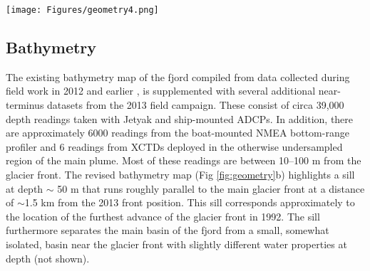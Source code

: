 \documentclass[10pt,letterpaper]{article}
\begin{document}
  \begin{figure*}[t]
 \begin{center}
  \texttt{[image: Figures/geometry4.png]}
  \caption{(a) Map of the lower part of Sarqardliup Sermia, and Sarqardleq fjord. The inset of Greenland indicates the location of the glacier. (b) Gridded bathymetry from in-situ observations (readings indicated by gray dots). Also shown are the surface height from ArcticDEM, collected during an overflight on 22 March 2013; Digital Elevation Map created by the Polar Geospatial Center from DigitalGlobe, Inc. imagery. (c) Surface height (blue) and bathymetry (black) along glacier front. Also shown is the isostatic height of flotation, computed from the surface height and assuming a density 880 kg/m$^3$. Locations of two main plumes are highlighted in panels (b) and (c) by black symbols. The green horizontal line above panel (c) and the letters A-D indicate the locations of the front profiles shown in Fig \ref{fig:fronts}.}
  \label{fig:geometry}
  \end{center}
\end{figure*}

\subsection{Bathymetry} \label{bathy}

The existing bathymetry map of the fjord compiled from data collected during field work in 2012 and earlier \citep{Stevens:2016tx}, is supplemented with several additional near-terminus datasets from the 2013 field campaign. These consist of circa 39,000 depth readings taken with Jetyak and ship-mounted ADCPs. In addition, there are approximately 6000 readings from the boat-mounted NMEA bottom-range profiler and 6 readings from XCTDs deployed in the otherwise undersampled region of the main plume. Most of these readings are between 10--100 m from the glacier front. The revised bathymetry map (Fig \ref{fig:geometry}b) highlights a sill at depth $\sim$ 50 m that runs roughly parallel to the main glacier front at a distance of $\sim$1.5 km from the 2013 front position. This sill corresponds approximately to the location of the furthest advance of the glacier front in 1992. The sill furthermore separates the main basin of the fjord from a small, somewhat isolated, basin near the glacier front with slightly different water properties at depth (not shown). 
\end{document}
